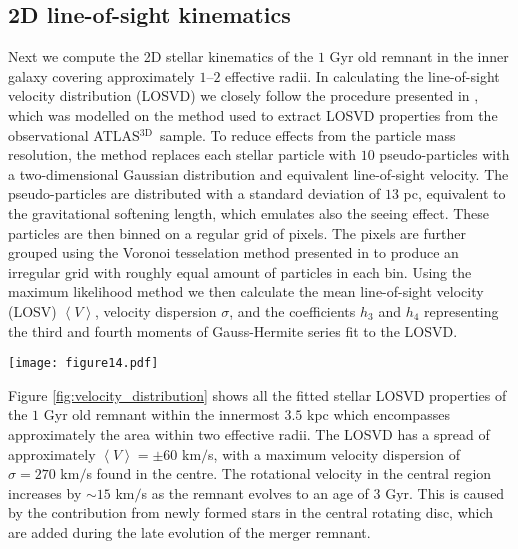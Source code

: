 \documentclass[a4paper,fleqn,usenatbib]{mnras}
\newcommand{\atlas}{\textsc{ATLAS$^\mathrm{3D}$}}
\begin{document}
\subsection{2D line-of-sight kinematics}

Next we compute the 2D stellar kinematics of the $1$ Gyr old remnant in the inner galaxy 
covering approximately $1$--$2$ effective radii. 
In calculating the line-of-sight velocity distribution (LOSVD) we closely follow the
procedure presented in \citet{2014MNRAS.444.3357N}, which was modelled on the method used to
extract LOSVD properties from the observational \atlas\ sample.  
To reduce effects from the particle mass resolution, the method replaces each 
stellar particle with $10$ pseudo-particles with a two-dimensional Gaussian 
distribution and equivalent line-of-sight velocity. The pseudo-particles are distributed with a 
standard deviation of $13$ pc, equivalent to the gravitational softening length, which emulates also the seeing effect. 
 These particles are then 
binned on a regular grid of pixels. The pixels are further grouped using the Voronoi tesselation method presented in 
\citet{2003MNRAS.342..345C} to produce an 
irregular grid with roughly 
equal amount of particles in each bin. Using the maximum likelihood method we then calculate the mean line-of-sight velocity (LOSV) 
$\left\langle V \right\rangle$, velocity dispersion $\sigma$, and the coefficients $h_3$ and $h_4$ representing the third and fourth 
moments of Gauss-Hermite series fit to the LOSVD. 

\begin{figure*}
\centering
\texttt{[image: figure14.pdf]}
    \caption{Mean line-of-sight velocity $\langle V \rangle$ (top left), velocity dispersion $\sigma$ (top right), 
    and the higher order Gauss-Hermite coefficients $h_3$ (bottom left) and $h_4$ (bottom right) in the inner $3.5$ kpc 
    (out to $\sim 2$ effective radii) of the
    Antennae remnant as it would be seen on the sky $1$ Gyr in the future. The contours show the 
    distribution of flux (mass) in $1$ mag intervals. The range of the colour bars is adjusted to be comparable with the 
    analysis presented in Sec. \ref{section:atlas_counterpart}.}
    \label{fig:velocity_distribution}
\end{figure*}


Figure \ref{fig:velocity_distribution} shows all the fitted stellar LOSVD 
properties of the $1$ Gyr old remnant within the innermost $3.5$ kpc which encompasses 
approximately the area within two effective radii. The LOSVD 
has a spread of approximately $\left\langle V \right\rangle=\pm 60$ km$/$s, 
with a maximum velocity dispersion of $\sigma=270$ km$/$s found in the centre.
The rotational velocity in the central region increases by $\sim15$ km$/$s 
as the remnant evolves to an age of $3$ Gyr. This is caused by  
the contribution from newly formed stars in the central rotating disc, 
which are added during the late evolution of the merger remnant. 
\end{document}
